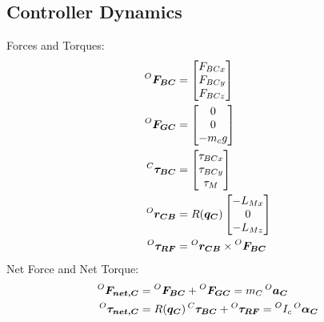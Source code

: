 \subsection{Controller Dynamics}
Forces and Torques:
\begin{align*}
  \prescript{O}{}{\bm{F_{BC}}} &=
  \begin{bmatrix}
    F_{BCx} \\ F_{BCy} \\ F_{BCz}
  \end{bmatrix} \\
  \prescript{O}{}{\bm{F_{GC}}} &=
  \begin{bmatrix}
    0 \\ 0 \\ -m_c g
  \end{bmatrix} \\
  \prescript{C}{}{\bm{\tau_{BC}}} &=
  \begin{bmatrix}
    \tau_{BCx} \\ \tau_{BCy} \\ \tau_{M} 
  \end{bmatrix} \\
  \prescript{O}{}{\bm{r_{CB}}} &= R(\bm{q_C}) \begin{bmatrix}
                                   -L_{Mx} \\ 0 \\ -L_{Mz}
                                 \end{bmatrix} \\
  \prescript{O}{}{\bm{\tau_{RF}}} &=  \prescript{O}{}{\bm{r_{CB}}} \times \prescript{O}{}{\bm{F_{BC}}}
\end{align*}
Net Force and Net Torque:
\begin{align}
  \prescript{O}{}{\bm{F_{net, C}}} &= \prescript{O}{}{\bm{F_{BC}}} + \prescript{O}{}{\bm{F_{GC}}} = m_C \prescript{O}{}{\bm{a_C}} \\
  \prescript{O}{}{\bm{\tau_{net, C}}} &= R(\bm{q_C})\prescript{C}{}{\bm{\tau_{BC}}} + \prescript{O}{}{\bm{\tau_{RF}}} = \prescript{O}{}{I_c} \prescript{O}{}{\bm{\alpha_C}}
\end{align}
